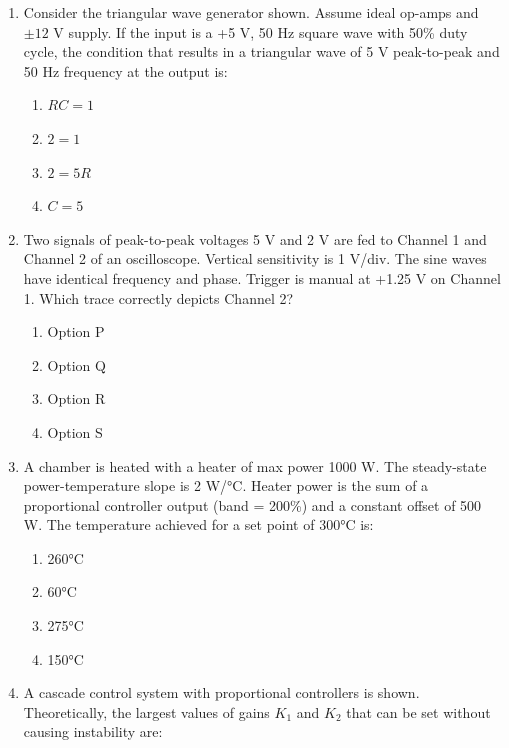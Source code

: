 \documentclass[journal]{IEEEtran}
\begin{document}
\begin{enumerate}
\item Consider the triangular wave generator shown. Assume ideal op-amps and $\pm12$ V supply. If the input is a +5 V, 50 Hz square wave with 50\% duty cycle, the condition that results in a triangular wave of 5 V peak-to-peak and 50 Hz frequency at the output is:

\begin{multicols}{2}
\begin{enumerate}
    \item $RC = 1$
    \item $2 = 1$
    \item $2 = 5R$
    \item $C = 5$
\end{enumerate}
\end{multicols}

\item Two signals of peak-to-peak voltages 5 V and 2 V are fed to Channel 1 and Channel 2 of an oscilloscope. Vertical sensitivity is 1 V/div. The sine waves have identical frequency and phase. Trigger is manual at +1.25 V on Channel 1. Which trace correctly depicts Channel 2?

\begin{multicols}{2}
\begin{enumerate}
    \item Option P
    \item Option Q
    \item Option R
    \item Option S
\end{enumerate}
\end{multicols}

\item A chamber is heated with a heater of max power 1000 W. The steady-state power-temperature slope is 2 W/°C. Heater power is the sum of a proportional controller output (band = 200\%) and a constant offset of 500 W. The temperature achieved for a set point of 300°C is:

\begin{multicols}{2}
\begin{enumerate}
    \item 260°C
    \item 60°C
    \item 275°C
    \item 150°C
\end{enumerate}
\end{multicols}

\item A cascade control system with proportional controllers is shown. Theoretically, the largest values of gains $K_1$ and $K_2$ that can be set without causing instability are:


\end{enumerate}
\end{document}
